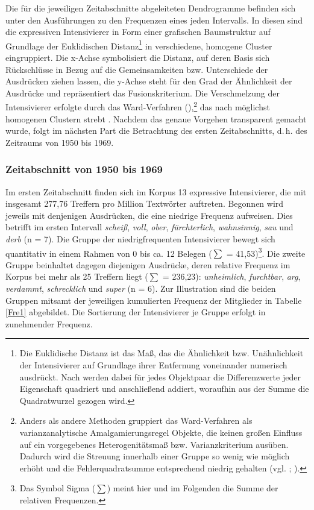 Die für die jeweiligen Zeitabschnitte abgeleiteten Dendrogramme befinden sich unter den Ausführungen zu den Frequenzen eines jeden Intervalls. In diesen sind die expressiven Intensivierer in Form einer grafischen Baumstruktur auf Grundlage der Euklidischen Distanz\footnote{Die Euklidische Distanz ist das Maß, das die Ähnlichkeit bzw. Unähnlichkeit der Intensivierer auf Grundlage ihrer Entfernung voneinander numerisch ausdrückt. Nach \citet[450]{Backhaus.2018} werden dabei \glqq{}für jedes Objektpaar die Differenzwerte jeder Eigenschaft quadriert und anschließend addiert\grqq{}, woraufhin aus der Summe die Quadratwurzel gezogen wird.} in verschiedene, homogene Cluster eingruppiert. Die x-Achse symbolisiert die Distanz, auf deren Basis sich Rückschlüsse in Bezug auf die Gemeinsamkeiten bzw. Unterschiede der Ausdrücken ziehen lassen, die y-Achse steht für den Grad der Ähnlichkeit der Ausdrücke und repräsentiert das Fusionskriterium. Die Verschmelzung der Intensivierer erfolgte durch das Ward-Verfahren (\citealt[]{Ward.1963}),\footnote{Anders als andere Methoden gruppiert das Ward-Verfahren als varianzanalytische Amalgamierungsregel Objekte, die keinen großen Einfluss auf ein vorgegebenes Heterogenitätsmaß bzw. Varianzkriterium ausüben. Dadurch wird die Streuung innerhalb einer Gruppe so wenig wie möglich erhöht und die Fehlerquadratsumme entsprechend niedrig gehalten {(vgl. \citealt[305]{Gries.2008}; \citealt[465f.]{Backhaus.2018}}).} das nach möglichst homogenen Clustern strebt \citep[vgl.][305]{Gries.2008}. Nachdem das genaue Vorgehen transparent gemacht wurde, folgt im nächsten Part die Betrachtung des ersten Zeitabschnitts, d.\,h. des Zeitraums von 1950 bis 1969.

\subsubsection{Zeitabschnitt von 1950 bis 1969}
Im ersten Zeitabschnitt finden sich im Korpus 13 expressive Intensivierer, die mit insgesamt 277,76 Treffern pro Million Textwörter auftreten. Begonnen wird jeweils mit denjenigen Ausdrücken, die eine niedrige Frequenz aufweisen. Dies betrifft im ersten Intervall \textit{scheiß}, \textit{voll}, \textit{ober}, \textit{fürchterlich}, \textit{wahnsinnig}, \textit{sau} und \textit{derb} (n = 7). Die Gruppe der niedrigfrequenten Intensivierer bewegt sich quantitativ in einem Rahmen von 0 bis ca. 12 Belegen (${\scriptstyle \sum{}}$ = 41,53)\footnote{Das Symbol Sigma (${\scriptstyle \sum{}}$) meint hier und im Folgenden die Summe der relativen Frequenzen.}. Die zweite Gruppe beinhaltet dagegen diejenigen Ausdrücke, deren relative Frequenz im Korpus bei mehr als 25 Treffern liegt (${\scriptstyle \sum{}}$ = 236,23): \textit{unheimlich}, \textit{furchtbar}, \textit{arg}, \textit{verdammt}, \textit{schrecklich} und \textit{super} (n = 6). Zur Illustration sind die beiden Gruppen mitsamt der jeweiligen kumulierten Frequenz der Mitglieder in Tabelle \ref{Fre1} abgebildet. Die Sortierung der Intensivierer je Gruppe erfolgt in zunehmender Frequenz.

